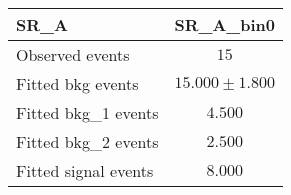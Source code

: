%

\begin{tabular}{lc}
\toprule
SR\_A & SR\_A\_bin0 \\
\midrule
Observed events & $15$\\

\midrule
Fitted bkg events & $  15.000 \pm    1.800$\\

\midrule
Fitted bkg\_1 events & $   4.500$\\
Fitted bkg\_2 events & $   2.500$\\
Fitted signal events & $  8.000$\\

\bottomrule
\end{tabular}

